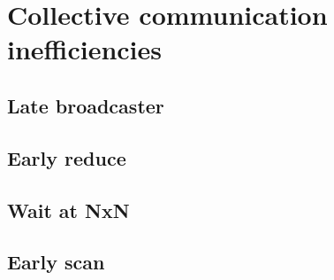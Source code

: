 \section{Collective communication inefficiencies}
\label{section:distributed-memory:collective}

\subsection{Late broadcaster}

\subsection{Early reduce}

\subsection{Wait at NxN}

\subsection{Early scan}
